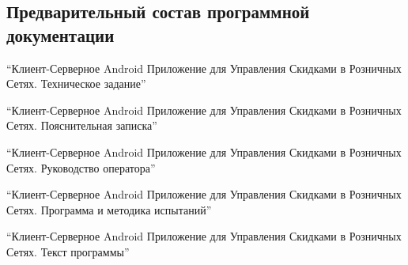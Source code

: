\subsection{Предварительный состав программной документации}
\begin{my_enumerate}
    \item ``Клиент-Серверное Android Приложение для Управления Скидками в Розничных Сетях. Техническое 
    задание''
    \item ``Клиент-Серверное Android Приложение для Управления Скидками в Розничных Сетях. 
    Пояснительная записка''
    \item ``Клиент-Серверное Android Приложение для Управления Скидками в Розничных Сетях. 
    Руководство оператора''
    \item ``Клиент-Серверное Android Приложение для Управления Скидками в Розничных Сетях. Программа и 
    методика испытаний''
    \item ``Клиент-Серверное Android Приложение для Управления Скидками в Розничных Сетях. Текст 
    программы''
\end{my_enumerate}


